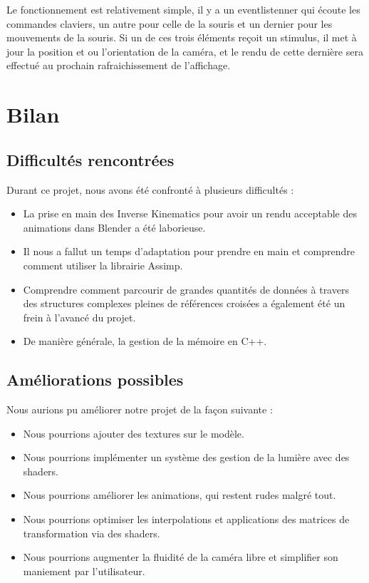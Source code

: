 \documentclass[a4paper]{report}
\begin{document}
Le fonctionnement est relativement simple, il y a un eventlistenner qui écoute les commandes claviers, un autre pour celle de la souris et un dernier pour les mouvements de la souris. Si un de ces trois éléments reçoit un stimulus, il met à jour la position et ou l'orientation de la caméra, et le rendu de cette dernière sera effectué au prochain rafraichissement de l'affichage. 

\newpage
\chapter{Bilan}
\section{Difficultés rencontrées}
\par
Durant ce projet, nous avons été confronté à plusieurs difficultés :
\begin{itemize}
\item La prise en main des Inverse Kinematics pour avoir un rendu acceptable des animations dans Blender a été laborieuse.
\item Il nous a fallut un temps d'adaptation pour prendre en main et comprendre comment utiliser la librairie Assimp.
\item Comprendre comment parcourir de grandes quantités de données à travers des structures complexes pleines de références croisées a également été un frein à l'avancé du projet.
\item De manière générale, la gestion de la mémoire en C++.
\end{itemize}
\section{Améliorations possibles}
\par
Nous aurions pu améliorer notre projet de la façon suivante :
\begin{itemize}
\item Nous pourrions ajouter des textures sur le modèle.
\item Nous pourrions implémenter un système des gestion de la lumière avec des shaders.
\item Nous pourrions améliorer les animations, qui restent rudes malgré tout.
\item Nous pourrions optimiser les interpolations et applications des matrices de transformation via des shaders.
\item Nous pourrions augmenter la fluidité de la caméra libre et simplifier son maniement par l'utilisateur.
\end{itemize}
\end{document}
